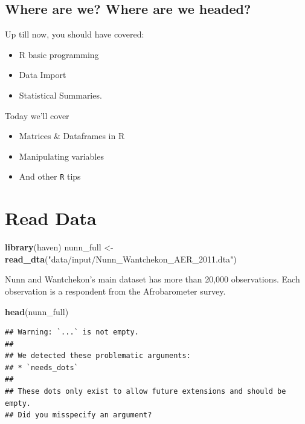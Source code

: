 \documentclass[
]{book}
\newenvironment{Shaded}{\begin{snugshade}}{\end{snugshade}}
\newcommand{\KeywordTok}[1]{\textcolor[rgb]{0.13,0.29,0.53}{\textbf{#1}}}
\newcommand{\NormalTok}[1]{#1}
\newcommand{\StringTok}[1]{\textcolor[rgb]{0.31,0.60,0.02}{#1}}
\providecommand{\tightlist}{%
  \setlength{\itemsep}{0pt}\setlength{\parskip}{0pt}}
\theoremstyle{definition}
\theoremstyle{definition}
\theoremstyle{definition}
\theoremstyle{definition}
\theoremstyle{remark}
\begin{document}
\hypertarget{where-are-we-where-are-we-headed-6}{%
\subsection*{Where are we? Where are we headed?}\label{where-are-we-where-are-we-headed-6}}

Up till now, you should have covered:

\begin{itemize}
\tightlist
\item
  R basic programming
\item
  Data Import
\item
  Statistical Summaries.
\end{itemize}

Today we'll cover

\begin{itemize}
\tightlist
\item
  Matrices \& Dataframes in R
\item
  Manipulating variables
\item
  And other \texttt{R} tips
\end{itemize}

\hypertarget{read-data-2}{%
\section{Read Data}\label{read-data-2}}

\begin{Shaded}
\begin{Highlighting}[]
\KeywordTok{library}\NormalTok{(haven)}
\NormalTok{nunn_full <-}\StringTok{ }\KeywordTok{read_dta}\NormalTok{(}\StringTok{"data/input/Nunn_Wantchekon_AER_2011.dta"}\NormalTok{)}
\end{Highlighting}
\end{Shaded}

Nunn and Wantchekon's main dataset has more than 20,000 observations. Each observation is a respondent from the Afrobarometer survey.

\begin{Shaded}
\begin{Highlighting}[]
\KeywordTok{head}\NormalTok{(nunn_full)}
\end{Highlighting}
\end{Shaded}

\begin{verbatim}
## Warning: `...` is not empty.
## 
## We detected these problematic arguments:
## * `needs_dots`
## 
## These dots only exist to allow future extensions and should be empty.
## Did you misspecify an argument?
\end{verbatim}
\end{document}
